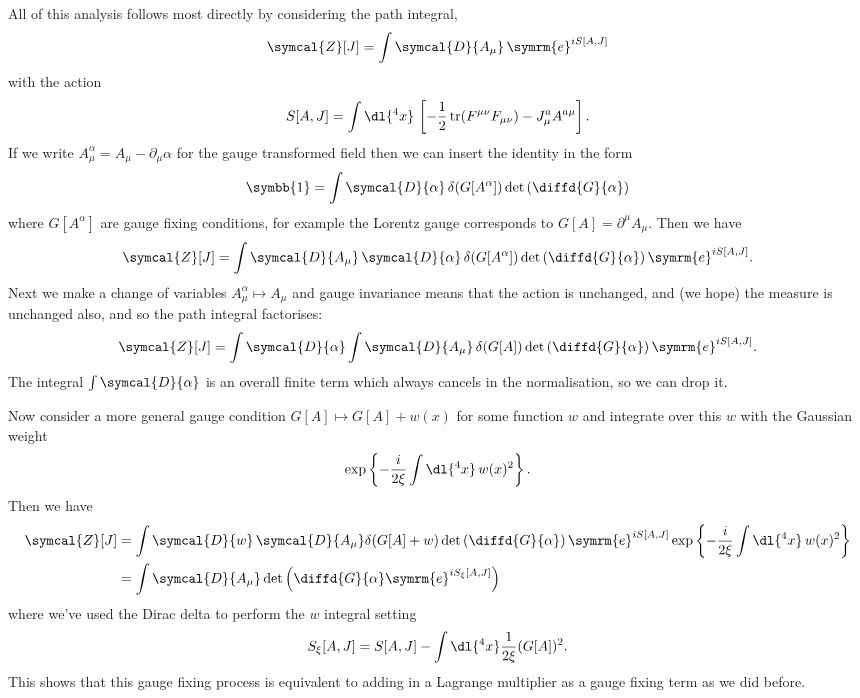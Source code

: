 \documentclass[fleqn]{NotesClass}
\newcommand{\e}{\symrm{e}}
\newcommand{\DL}[1]{\symcal{D}{#1}}
\newcommand{\DD}[1]{\,\symcal{D}{#1}}
\DeclareMathOperator{\tr}{tr}
\newcommand{\identityMatrix}{\symbb{1}}
\newcommand{\partitionFunction}{\symcal{Z}}
\begin{document}
    All of this analysis follows most directly by considering the path integral,
    \begin{equation}
        \partitionFunction[J] = \int \DL{A_\mu} \, \e^{iS[A, J]}
    \end{equation}
    with the action
    \begin{equation}
        S[A, J] = \int \dl{^4x} \, \left[ -\frac{1}{2}\tr(F^{\mu\nu} F_{\mu\nu}) - J^a_\mu A^{a\mu} \right].
    \end{equation}
    If we write \(A_\mu^\alpha = A_\mu - \partial_\mu \alpha\) for the gauge transformed field then we can insert the identity in the form
    \begin{equation}
        \identityMatrix = \int \DL{\alpha} \, \delta(G[A^\alpha]) \det\left( \diffd{G}{\alpha} \right)
    \end{equation}
    where \(G[A^\alpha]\) are gauge fixing conditions, for example the Lorentz gauge corresponds to \(G[A] = \partial^\mu A_\mu\).
    Then we have
    \begin{equation}
        \partitionFunction[J] = \int \DL{A_\mu} \DD{\alpha} \, \delta(G[A^\alpha]) \det\left( \diffd{G}{\alpha} \right) \e^{iS[A, J]}.
    \end{equation}
    Next we make a change of variables \(A_\mu^\alpha \mapsto A_\mu\) and gauge invariance means that the action is unchanged, and (we hope) the measure is unchanged also, and so the path integral factorises:
    \begin{equation}
        \partitionFunction[J] = \int\DL{\alpha} \int\DL{A_\mu} \, \delta(G[A]) \det\left( \diffd{G}{\alpha} \right) \e^{iS[A, J]}.
    \end{equation}
    The integral \(\int\DL{\alpha}\) is an overall finite term which always cancels in the normalisation, so we can drop it.
    
    Now consider a more general gauge condition \(G[A] \mapsto G[A] + w(x)\) for some function \(w\) and integrate over this \(w\) with the Gaussian weight
    \begin{equation}
        \exp\left\{ -\frac{i}{2\xi} \int \dl{^4x} \, w(x)^2 \right\}.
    \end{equation}
    Then we have
    \begin{align}
        \partitionFunction[J] &= \int \DL{w} \DD{A_\mu} \delta(G[A] + w) \det\left( \diffd{G}{\alpha} \right) \e^{iS[A, J]} \exp\left\{ -\frac{i}{2\xi} \int \dl{^4x} \, w(x)^2 \right\} \notag\\
        &= \int \DL{A_\mu} \det\left( \diffd{G}{\alpha} \e^{iS_\xi[A, J]} \right)
    \end{align}
    where we've used the Dirac delta to perform the \(w\) integral setting
    \begin{equation}
        S_\xi[A, J] = S[A, J] - \int \dl{^4x} \frac{1}{2\xi}(G[A])^2.
    \end{equation}
    This shows that this gauge fixing process is equivalent to adding in a Lagrange multiplier as a gauge fixing term as we did before.
    
\end{document}
